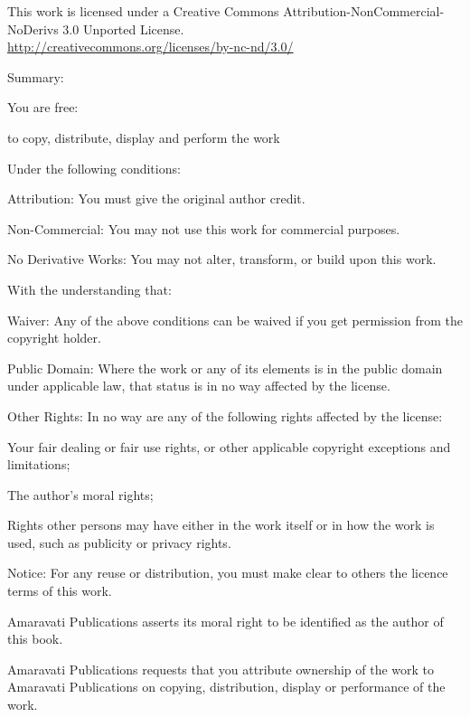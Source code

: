 
{\smaller\setlength{\parindent}{0pt}%
\raggedright\label{copyright-details}
{\centering

{\large\ccbyncnd}
\bigskip

This work is licensed under a Creative Commons Attribution-NonCommercial-NoDerivs 3.0 Unported License.\\
\href{http://creativecommons.org/licenses/by-nc-nd/3.0/}{http://creativecommons.org/licenses/by-nc-nd/3.0/}

}
\bigskip

Summary:
\bigskip

You are free:
\vspace*{-\baselineskip}

\begin{packeditemize}
\item to copy, distribute, display and perform the work
\end{packeditemize}

Under the following conditions:
\vspace*{-\baselineskip}

\begin{packeditemize}
\item Attribution: You must give the original author credit.
\item Non-Commercial: You may not use this work for commercial purposes.
\item No Derivative Works: You may not alter, transform, or build upon this work.
\end{packeditemize}

With the understanding that:
\vspace*{-\baselineskip}

\begin{packeditemize}
\item Waiver: Any of the above conditions can be waived if you get permission from the copyright holder.
\item Public Domain: Where the work or any of its elements is in the public domain under applicable law, that status is in no way affected by the license.
\item Other Rights: In no way are any of the following rights affected by the license:
\begin{packeditemize}
\item Your fair dealing or fair use rights, or other applicable copyright exceptions and limitations;
\item The author's moral rights;
\item Rights other persons may have either in the work itself or in how the work is used, such as publicity or privacy rights.
\end{packeditemize}
\item Notice: For any reuse or distribution, you must make clear to others the licence terms of this work.
\end{packeditemize}

Amaravati Publications asserts its moral right to be identified as the author of this book.

Amaravati Publications requests that you attribute ownership of the work to Amaravati Publications on copying, distribution, display or performance of the work.

}
